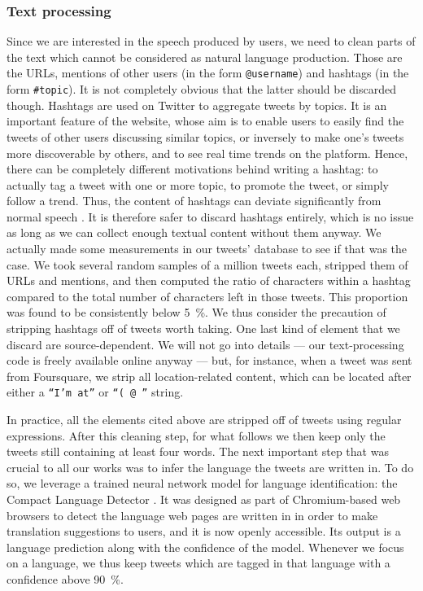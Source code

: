 \documentclass[../thesis.tex]{subfiles}
\begin{document}
\subsubsection{Text processing}
\label{sec:method_text_process}
Since we are interested in the speech produced by users, we need to clean parts of the
text which cannot be considered as natural language production. Those are the URLs,
mentions of other users (in the form \texttt{@username}) and hashtags (in the form
\texttt{\#topic}). It is not completely obvious that the latter should be discarded
though. Hashtags are used on Twitter to aggregate tweets by topics. It is an important
feature of the website, whose aim is to enable users to easily find the tweets of other
users discussing similar topics, or inversely to make one's tweets more discoverable by
others, and to see real time trends on the platform. Hence, there can be completely
different motivations behind writing a hashtag: to actually tag a tweet with one or more
topic, to promote the tweet, or simply follow a trend. Thus, the content of hashtags can
deviate significantly from normal speech \cite{PageLinguisticsSelfbranding2012}. It is
therefore safer to discard hashtags entirely, which is no issue as long as we can
collect enough textual content without them anyway. We actually made some measurements
in our tweets' database to see if that was the case. We took several random samples of a
million tweets each, stripped them of URLs and mentions, and then computed the ratio of
characters within a hashtag compared to the total number of characters left in those
tweets. This proportion was found to be consistently below \SI{5}{\percent}. We thus
consider the precaution of stripping hashtags off of tweets worth taking. One last kind
of element that we discard are source-dependent. We will not go into details --- our
text-processing code is freely available online anyway \cite{LoufWordsuse2023} --- but,
for instance, when a tweet was sent from Foursquare, we strip all location-related
content, which can be located after either a \texttt{``I'm at''} or \texttt{``( @ ''}
string.

In practice, all the elements cited above are stripped off of tweets using regular
expressions. After this cleaning step, for what follows we then keep only the tweets
still containing at least four words. The next important step that was crucial to all
our works was to infer the language the tweets are written in. To do so, we leverage a
trained neural network model for language identification: the Compact Language Detector
\cite{SalcianuCompactLanguage2023}. It was designed as part of Chromium-based web
browsers to detect the language web pages are written in in order to make translation
suggestions to users, and it is now openly accessible. Its output is a language
prediction along with the confidence of the model. Whenever we focus on a language, we
thus keep tweets which are tagged in that language with a confidence above
\SI{90}{\percent}.
\end{document}
